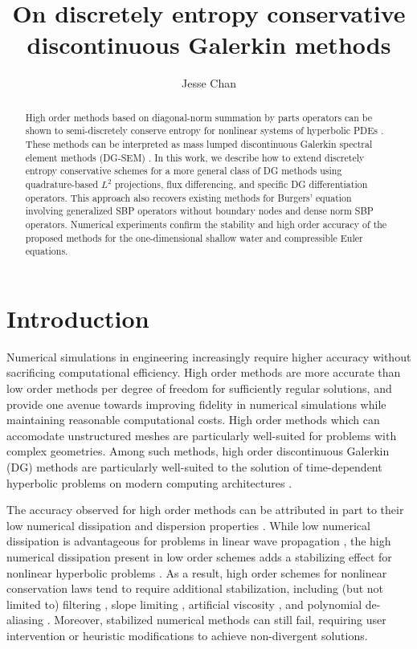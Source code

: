 \documentclass[preprint,10pt]{article}
\date{}
\author{Jesse Chan}
\title{On discretely entropy conservative discontinuous Galerkin methods}
\theoremstyle{definition}
\theoremstyle{lemma}
\theoremstyle{theorem}
\theoremstyle{assumption}
\begin{document}
\maketitle

\begin{abstract}
High order methods based on diagonal-norm summation by parts operators can be shown to semi-discretely conserve entropy for nonlinear systems of hyperbolic PDEs \cite{fisher2013high,carpenter2014entropy}.  These methods can be interpreted as mass lumped discontinuous Galerkin spectral element methods (DG-SEM) \cite{gassner2016split,gassner2016well,wintermeyer2017entropy, chen2017entropy}.  In this work, we describe how to extend discretely entropy conservative schemes for a more general class of DG methods using quadrature-based $L^2$ projections, flux differencing, and specific DG differentiation operators.  This approach also recovers existing methods for Burgers' equation involving generalized SBP operators without boundary nodes and dense norm SBP operators.  Numerical experiments confirm the stability and high order accuracy of the proposed methods for the one-dimensional shallow water and compressible Euler equations.  
\end{abstract}


\section{Introduction}

Numerical simulations in engineering increasingly require higher accuracy without sacrificing computational efficiency.  High order methods are more accurate than low order methods per degree of freedom for sufficiently regular solutions, and provide one avenue towards improving fidelity in numerical simulations while maintaining reasonable computational costs.  High order methods which can accomodate unstructured meshes are particularly well-suited for problems with complex geometries.  Among such methods, high order discontinuous Galerkin (DG) methods are particularly well-suited to the solution of time-dependent hyperbolic problems on modern computing architectures \cite{hesthaven2007nodal, klockner2009nodal}.  

The accuracy observed for high order methods can be attributed in part to their low numerical dissipation and dispersion properties \cite{ainsworth2004dispersive}.  While low numerical dissipation is advantageous for problems in linear wave propagation \cite{komatitsch1998spectral}, the high numerical dissipation present in low order schemes adds a stabilizing effect for nonlinear hyperbolic problems \cite{wang2013high}.  As a result, high order schemes for nonlinear conservation laws tend to require additional stabilization, including (but not limited to) filtering \cite{hesthaven2007nodal}, slope limiting \cite{krivodonova2007limiters}, artificial viscosity \cite{persson2006sub}, and polynomial de-aliasing \cite{ karniadakis2013spectral, kirby2003aliasing}.  Moreover, stabilized numerical methods can still fail, requiring user intervention or heuristic modifications to achieve non-divergent solutions.  
\end{document}
